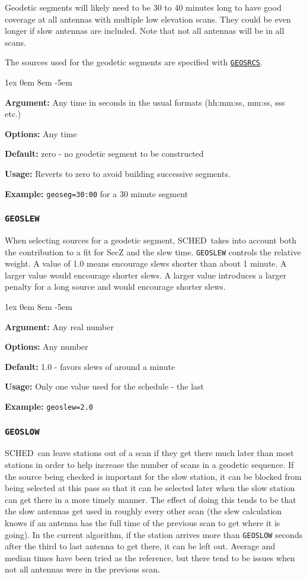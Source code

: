 \documentclass{report}
\newcommand{\schedb}{{\sc SCHED~}}
\newcommand{\rcwbox}[5]{
  \begin{list}{}{\parsep 1ex  \itemsep 0em
                 \leftmargin 8em  \itemindent -5em }
    \item {\bf Argument:} #1
    \item {\bf Options:}  #2
    \item {\bf Default:}  #3
    \item {\bf Usage:}    #4
    \item {\bf Example:}  #5
  \end{list}
}
\begin{document}
Geodetic segments will likely need to be 30 to 40 minutes long to have
good coverage at all antennas with multiple low elevation scans.  They
could be even longer if slow antennas are included.  Note that not all
antennas will be in all scans.

The sources used for the geodetic segments are specified with
{\hyperref[MP:GEOSRCS]{{\tt GEOSRCS}}}.

\rcwbox
{Any time in seconds in the usual formats (hh:mm:ss, mm:ss, sss etc.)}
{Any time}
{zero - no geodetic segment to be constructed}
{Reverts to zero to avoid building successive segments.}
{{\tt geoseg=30:00} for a 30 minute segment}

\subsubsection{\label{MP:GEOSLEW}{\tt GEOSLEW}}

When selecting sources for a geodetic segment, \schedb takes into
account both the contribution to a fit for SecZ and the slew time.
{\tt GEOSLEW} controls the relative weight.  A value of 1.0 means
encourage slews shorter than about 1 minute.  A larger value would
encourage shorter slews.  A larger value introduces a larger penalty
for a long source and would encourage shorter slews.

\rcwbox
{Any real number}
{Any number}
{1.0 - favors slews of around a minute}
{Only one value used for the schedule - the last}
{{\tt geoslew=2.0}}


\subsubsection{\label{MP:GEOSLOW}{\tt GEOSLOW}}

\schedb can leave stations out of a scan if they get there much later
than most stations in order to help increase the number of scans in
a geodetic sequence.  If the source being checked is important for
the slow station, it can be blocked from being selected at this pass
so that it can be selected later when the slow station can get there in
a more timely manner.  The effect of doing this tends to be that the
slow antennas get used in roughly every other scan (the slew calculation
knows if an antenna has the full time of the previous scan to get where
it is going).  In the current algorithm, if the station arrives more
than {\tt GEOSLOW} seconds after the third to last antenna to get there,
it can be left out.  Average and median times have been tried as the
reference, but there tend to be issues when not all antennas were in
the previous scan.
\end{document}
